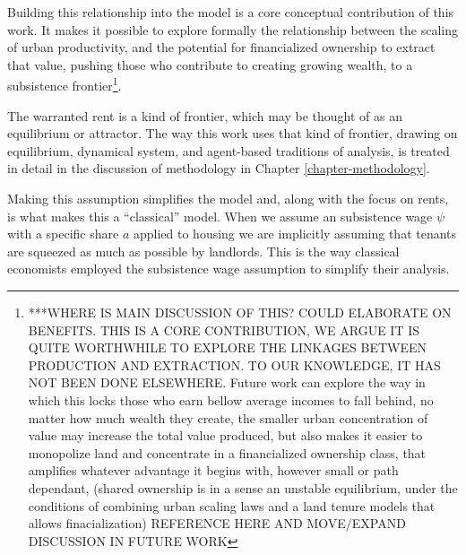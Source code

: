 Building this relationship into the model is a core conceptual contribution of this work. It makes it possible to explore formally the relationship between the scaling of urban productivity, and the potential for financialized ownership to extract that value, pushing those who contribute to creating growing wealth, to a subsistence frontier\footnote{***WHERE IS MAIN DISCUSSION OF THIS? %
COULD ELABORATE ON BENEFITS. THIS IS A CORE CONTRIBUTION, WE ARGUE IT IS QUITE WORTHWHILE TO EXPLORE THE LINKAGES BETWEEN PRODUCTION AND EXTRACTION. TO OUR KNOWLEDGE, IT HAS NOT BEEN DONE ELSEWHERE. Future work can explore the way in which this locks those who earn bellow average incomes to fall behind, no matter how much wealth they create, the smaller urban concentration of value may increase the total value produced, but also makes it easier to monopolize land and concentrate in a financialized ownership class, that amplifies whatever advantage it begins with, however small or path dependant, (shared ownership is in a sense an unstable equilibrium, under the conditions of combining urban scaling laws and a land tenure models that allows finacialization)  REFERENCE HERE AND  MOVE/EXPAND DISCUSSION IN FUTURE WORK}.

The warranted rent %
is a kind of frontier, which may be thought of as an equilibrium or attractor. The way this work uses that kind of frontier, drawing on equilibrium, dynamical system, and agent-based traditions of analysis, is treated in detail in the discussion of methodology in Chapter \ref{chapter-methodology}.

Making this assumption simplifies the model and, along with the focus on rents, is what makes this a ``classical'' model.  When we assume an subsistence wage $\psi$ with a specific share $a$ applied to housing we are implicitly assuming that tenants are squeezed as much as possible by landlords. This is the way classical economists employed the subsistence wage assumption to simplify their analysis. 



